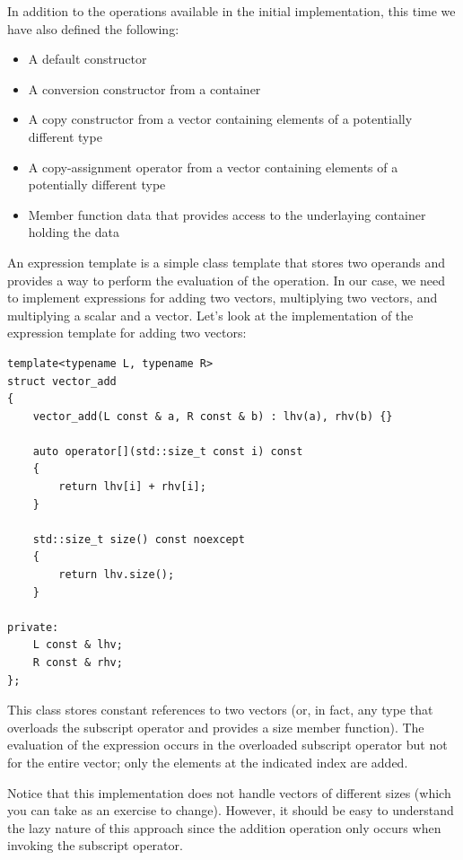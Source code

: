 In addition to the operations available in the initial implementation, this time we have also defined the following:

\begin{itemize}
\item
A default constructor

\item
A conversion constructor from a container

\item
A copy constructor from a vector containing elements of a potentially different type

\item
A copy-assignment operator from a vector containing elements of a potentially different type

\item
Member function data that provides access to the underlaying container holding the data
\end{itemize}

An expression template is a simple class template that stores two operands and provides a way to perform the evaluation of the operation. In our case, we need to implement expressions for adding two vectors, multiplying two vectors, and multiplying a scalar and a vector. Let’s look at the implementation of the expression template for adding two vectors:

\begin{lstlisting}[style=styleCXX]
template<typename L, typename R>
struct vector_add
{
	vector_add(L const & a, R const & b) : lhv(a), rhv(b) {}
	
	auto operator[](std::size_t const i) const
	{
		return lhv[i] + rhv[i];
	}

	std::size_t size() const noexcept
	{
		return lhv.size();
	}

private:
	L const & lhv;
	R const & rhv;
};
\end{lstlisting}

This class stores constant references to two vectors (or, in fact, any type that overloads the subscript operator and provides a size member function). The evaluation of the expression occurs in the overloaded subscript operator but not for the entire vector; only the elements at the indicated index are added.

Notice that this implementation does not handle vectors of different sizes (which you can take as an exercise to change). However, it should be easy to understand the lazy nature of this approach since the addition operation only occurs when invoking the subscript operator.

